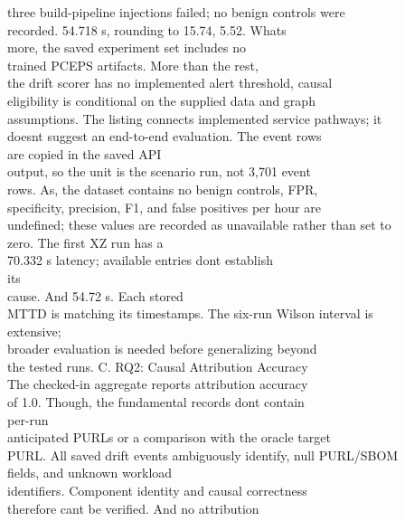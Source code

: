 \documentclass[conference]{IEEEtran}
\begin{document}
three build-pipeline injections failed; no benign controls were\\
recorded. 54.718 s, rounding to 15.74, 5.52. What\textquotesingle s\\
more, the saved experiment set includes no\\
trained PCEPS artifacts. More than the rest,\\
the drift scorer has no implemented alert threshold, causal\\
eligibility is conditional on the supplied data and graph\\
assumptions. The listing connects implemented service pathways; it\\
doesn\textquotesingle t suggest an end-to-end evaluation. The event rows\\
are copied in the saved API\\
output, so the unit is the scenario run, not 3,701 event\\
rows. As, the dataset contains no benign controls, FPR,\\
specificity, precision, F1, and false positives per hour are\\
undefined; these values are recorded as unavailable rather than set to\\
zero. The first XZ run has a\\
70.332 s latency; available entries don\textquotesingle t establish\\
its\\
cause. And 54.72 s. Each stored\\
MTTD is matching its timestamps. The six-run Wilson interval is\\
extensive;\\
broader evaluation is needed before generalizing beyond\\
the tested runs. C. RQ2: Causal Attribution Accuracy\\
The checked-in aggregate reports attribution accuracy\\
of 1.0. Though, the fundamental records don\textquotesingle t contain\\
per-run\\
anticipated PURLs or a comparison with the oracle target\\
PURL. All saved drift events ambiguously identify, null PURL/SBOM\\
fields, and unknown workload\\
identifiers. Component identity and causal correctness\\
therefore can\textquotesingle t be verified. And no attribution\\
\end{document}
